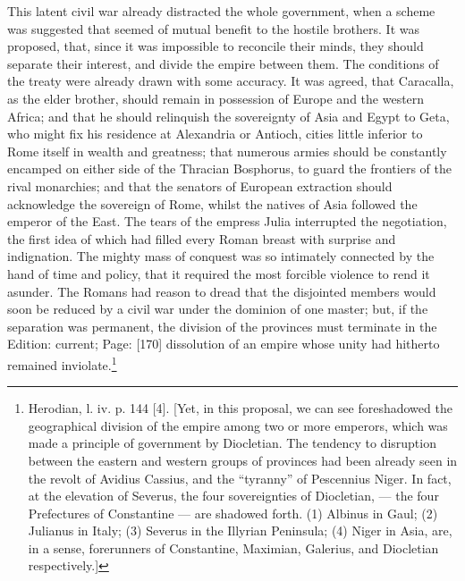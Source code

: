 This latent civil war already distracted the whole government, when a scheme was suggested that seemed of mutual benefit to the hostile brothers. It was proposed, that, since it was impossible to reconcile their minds, they should separate their interest, and divide the empire between them. The conditions of the treaty were already drawn with some accuracy. It was agreed, that Caracalla, as the elder brother, should remain in possession of Europe and the western Africa; and that he should relinquish the sovereignty of Asia and Egypt to Geta, who might fix his residence at Alexandria or Antioch, cities little inferior to Rome itself in wealth and greatness; that numerous armies should be constantly encamped on either side of the Thracian Bosphorus, to guard the frontiers of the rival monarchies; and that the senators of European extraction should acknowledge the sovereign of Rome, whilst the natives of Asia followed the emperor of the East. The tears of the empress Julia interrupted the negotiation, the first idea of which had filled every Roman breast with surprise and indignation. The mighty mass of conquest was so intimately connected by the hand of time and policy, that it required the most forcible violence to rend it asunder. The Romans had reason to dread that the disjointed members would soon be reduced by a civil war under the dominion of one master; but, if the separation was permanent, the division of the provinces must terminate in the Edition: current; Page: [170] dissolution of an empire whose unity had hitherto remained inviolate.\footnote{Herodian, l. iv. p. 144 [4]. [Yet, in this proposal, we can see foreshadowed the geographical division of the empire among two or more emperors, which was made a principle of government by Diocletian. The tendency to disruption between the eastern and western groups of provinces had been already seen in the revolt of Avidius Cassius, and the \texthebrew{“}tyranny\texthebrew{}” of Pescennius Niger. In fact, at the elevation of Severus, the four sovereignties of Diocletian, \texthebrew{—} the four Prefectures of Constantine \texthebrew{—} are shadowed forth. (1) Albinus in Gaul; (2) Julianus in Italy; (3) Severus in the Illyrian Peninsula; (4) Niger in Asia, are, in a sense, forerunners of Constantine, Maximian, Galerius, and Diocletian respectively.]}

